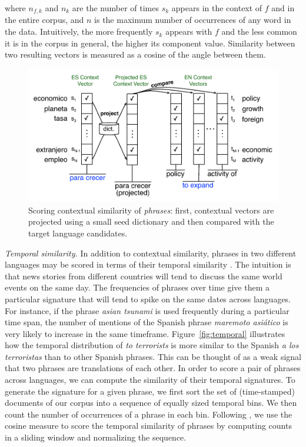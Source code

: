 \documentclass[11pt]{article}
\newcommand{\mtodo}[1]{}
\newcommand{\figref}[1]{Figure~\ref{#1}}
\newcommand{\paraheader}[1]{\vskip 0.05in \noindent\emph{#1}}
\begin{document}
\noindent where $n_{f,k}$ and $n_{k}$ are the number of times $s_{k}$ appears in the context of $f$ and in the entire corpus, and $n$ is the maximum number of occurrences of any word in the data.  Intuitively, the more frequently $s_{k}$ appears with $f$ and the less common it is in the corpus in general, the higher its component value.  Similarity between two resulting vectors is measured as a cosine of the angle between them.

\begin{figure}[t]
\includegraphics[width=\linewidth]{../figures/contextual/contextual}
\caption{Scoring contextual similarity of \emph{phrases}: first, contextual vectors are projected using a small seed dictionary and then compared with the target language candidates.}
\label{fig:contextual}
\end{figure}


\paraheader{Temporal similarity.} In addition to contextual similarity, phrases in two different languages may be scored in terms of their temporal similarity \cite{alfonseca-ciaramita-hall:2009:EMNLP}.  The intuition is that news stories from different countries will tend to discuss the same world events on the same day.  The frequencies of phrases over time give them a particular signature that will tend to spike on the same dates across languages.  For instance, if the phrase {\it asian tsunami} is used frequently during a particular time span, the number of mentions of the Spanish phrase {\it maremoto asi\'{a}tico} is very likely to increase in the same timeframe. \figref{fig:temporal} illustrates how the temporal distribution of {\it to terrorists} is more similar to the Spanish {\it a los terroristas} than to other Spanish phrases.  This can be thought of as a weak signal that two phrases are translations of each other.  In order to score a pair of phrases across languages, we can compute the similarity of their temporal signatures. To generate the signature for a given phrase, we first sort the set of (time-stamped) documents of our corpus into a sequence of equally sized temporal bins.  We then count the number of occurrences of a phrase in each bin.  Following , we use the cosine measure to score the temporal similarity of phrases by computing counts in a sliding window and normalizing the sequence.
\end{document}
